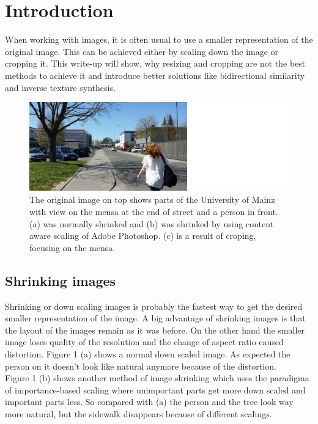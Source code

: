\section{Introduction}
When working with images, it is often usual to use a smaller representation of the original image.
This can be achieved either by scaling down the image or cropping it. This write-up will show, why resizing and cropping are not the best methods to achieve it and introduce better solutions like bidirectional similarity\cite{bisi} and inverse texture synthesis\cite{its}. 

\begin{figure}[h]
\centering
\includegraphics[scale=0.9]{img/ShrinkingCropping}
\caption[blah]{The original image on top shows parts of the University of Mainz with view on
the mensa at the end of street and a person in front. (a) was normally shrinked and (b) was shrinked by using content aware scaling of Adobe Photoshop\footnotemark. (c) is a result of croping, focusing on the mensa.}
\label{Image shrinking}
\end{figure}


\subsection{Shrinking images}
Shrinking or down scaling images is probably the fastest way to get the desired smaller representation of the image. A big advantage of shrinking images is that the layout of the images remain as it was before. On the other hand the smaller image loses quality of the resolution and the change of aspect ratio caused distortion. Figure 1 (a) shows a normal down scaled image. As expected the person on it doesn't look like natural anymore because of the distortion.\\
Figure 1 (b) shows another method of image shrinking which uses the paradigma of importance-based scaling where unimportant parts get more down scaled and important parts less. So compared with (a) the person and the tree look way more natural, but the sidewalk disappears because of different scalings.



